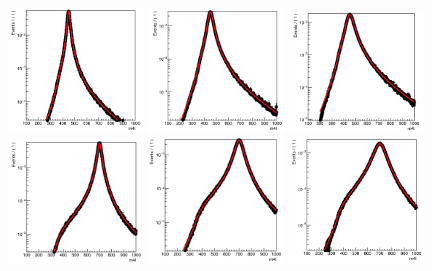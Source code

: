 \begin{figure}[!htbp]
    \centering
    \includegraphics[width=0.32\textwidth]{figures/HMHZZ/signal/LWA/450_5.png}
    \includegraphics[width=0.32\textwidth]{figures/HMHZZ/signal/LWA/450_10.png}
    \includegraphics[width=0.32\textwidth]{figures/HMHZZ/signal/LWA/450_15.png}\\
    \includegraphics[width=0.32\textwidth]{figures/HMHZZ/signal/LWA/700_5.png}
    \includegraphics[width=0.32\textwidth]{figures/HMHZZ/signal/LWA/700_10.png}
    \includegraphics[width=0.32\textwidth]{figures/HMHZZ/signal/LWA/700_15.png}\\

\end{figure}
